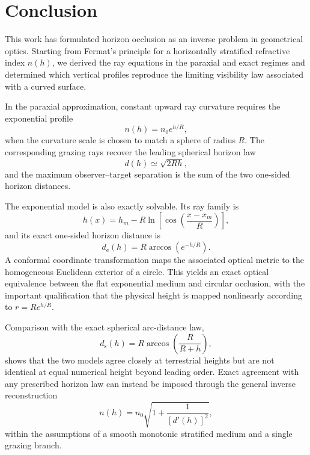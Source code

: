 \section{Conclusion}
\label{sec:conclusion}

This work has formulated horizon occlusion as an inverse problem in
geometrical optics. Starting from Fermat's principle for a horizontally
stratified refractive index $n(h)$, we derived the ray equations in the
paraxial and exact regimes and determined which vertical profiles reproduce
the limiting visibility law associated with a curved surface.

In the paraxial approximation, constant upward ray curvature requires the
exponential profile
\begin{equation}
    n(h)=n_0 e^{h/R},
\end{equation}
when the curvature scale is chosen to match a sphere of radius $R$. The
corresponding grazing rays recover the leading spherical horizon law
\begin{equation}
    d(h)\simeq\sqrt{2Rh},
\end{equation}
and the maximum observer--target separation is the sum of the two one-sided
horizon distances.

The exponential model is also exactly solvable. Its ray family is
\begin{equation}
    h(x)
    =
    h_m
    -R\ln\!\left[
        \cos\!\left(\frac{x-x_m}{R}\right)
    \right],
\end{equation}
and its exact one-sided horizon distance is
\begin{equation}
    d_{\mathrm e}(h)
    =
    R\arccos\!\left(e^{-h/R}\right).
\end{equation}
A conformal coordinate transformation maps the associated optical metric to
the homogeneous Euclidean exterior of a circle. This yields an exact optical
equivalence between the flat exponential medium and circular occlusion, with
the important qualification that the physical height is mapped nonlinearly
according to $r=Re^{h/R}$.

Comparison with the exact spherical arc-distance law,
\begin{equation}
    d_{\mathrm s}(h)
    =
    R\arccos\!\left(\frac{R}{R+h}\right),
\end{equation}
shows that the two models agree closely at terrestrial heights but are not
identical at equal numerical height beyond leading order. Exact agreement
with any prescribed horizon law can instead be imposed through the general
inverse reconstruction
\begin{equation}
    n(h)
    =
    n_0\sqrt{1+\frac{1}{[d'(h)]^2}},
\end{equation}
within the assumptions of a smooth monotonic stratified medium and a single
grazing branch.

